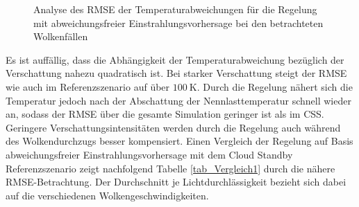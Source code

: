 \begin{figure}[h!]
    \centering
    \setlength{\fboxsep}{1pt}
    \setlength{\fboxrule}{1pt}
\caption[Analyse des RMSE der Temperaturabweichungen für die Regelung mit abweichungsfreier Einstrahlungsvorhersage bei den betrachteten Wolkenfällen]{Analyse des RMSE der Temperaturabweichungen für die Regelung mit abweichungsfreier Einstrahlungsvorhersage bei den betrachteten Wolkenfällen}
    \label{fig_RMSEallwissend}
\end{figure}

Es ist auffällig, dass die Abhängigkeit der Temperaturabweichung bezüglich der Verschattung nahezu quadratisch ist.
Bei starker Verschattung steigt der RMSE wie auch im Referenzszenario auf über $\SI{100}{\kelvin}$.
Durch die Regelung nähert sich die Temperatur jedoch nach der Abschattung der Nennlasttemperatur schnell wieder an, sodass der RMSE über die gesamte Simulation geringer ist als im CSS.
Geringere Verschattungsintensitäten werden durch die Regelung auch während des Wolkendurchzugs besser kompensiert.
Einen Vergleich der Regelung auf Basis abweichungsfreier Einstrahlungsvorhersage mit dem Cloud Standby Referenzszenario zeigt nachfolgend Tabelle \ref{tab_Vergleich1} durch die nähere RMSE-Betrachtung.
Der Durchschnitt je Lichtdurchlässigkeit bezieht sich dabei auf die verschiedenen Wolkengeschwindigkeiten.

